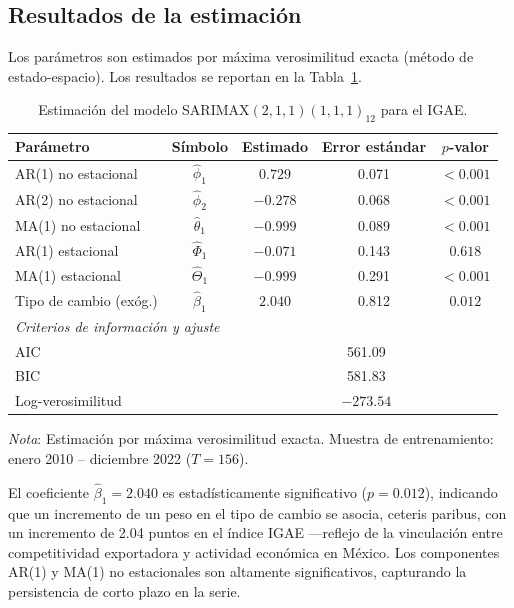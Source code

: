 \documentclass[12pt,a4paper]{article}
\begin{document}
\subsection{Resultados de la estimación}

Los parámetros son estimados por máxima verosimilitud exacta (método de estado-espacio). Los resultados se reportan en la Tabla~\ref{tab:resultados}.

\begin{table}[H]
  \centering
  \caption{Estimación del modelo SARIMAX$(2,1,1)(1,1,1)_{12}$ para el IGAE.}
  \label{tab:resultados}
  \begin{tabular}{lcccc}
    \toprule
    \textbf{Parámetro} & \textbf{Símbolo} & \textbf{Estimado} & \textbf{Error estándar} & \textbf{$p$-valor} \\
    \midrule
    AR(1) no estacional     & $\hat{\phi}_1$    & $0.729$  & 0.071 & $<0.001$ \\
    AR(2) no estacional     & $\hat{\phi}_2$    & $-0.278$ & 0.068 & $<0.001$ \\
    MA(1) no estacional     & $\hat{\theta}_1$  & $-0.999$ & 0.089 & $<0.001$ \\
    AR(1) estacional        & $\hat{\Phi}_1$    & $-0.071$ & 0.143 & $0.618$  \\
    MA(1) estacional        & $\hat{\Theta}_1$  & $-0.999$ & 0.291 & $<0.001$ \\
    Tipo de cambio (exóg.)  & $\hat{\beta}_1$   & $2.040$  & 0.812 & $0.012$  \\
    \midrule
    \multicolumn{5}{l}{\textit{Criterios de información y ajuste}} \\
    \midrule
    AIC   & & \multicolumn{3}{c}{561.09} \\
    BIC   & & \multicolumn{3}{c}{581.83} \\
    Log-verosimilitud & & \multicolumn{3}{c}{$-273.54$} \\
    \bottomrule
  \end{tabular}
  \begin{tablenotes}
    \small
    \item \textit{Nota}: Estimación por máxima verosimilitud exacta. Muestra de entrenamiento: enero 2010 -- diciembre 2022 ($T=156$).
  \end{tablenotes}
\end{table}

El coeficiente $\hat{\beta}_1 = 2.040$ es estadísticamente significativo ($p=0.012$), indicando que un incremento de un peso en el tipo de cambio se asocia, ceteris paribus, con un incremento de 2.04 puntos en el índice IGAE —reflejo de la vinculación entre competitividad exportadora y actividad económica en México. Los componentes AR(1) y MA(1) no estacionales son altamente significativos, capturando la persistencia de corto plazo en la serie.
\end{document}
